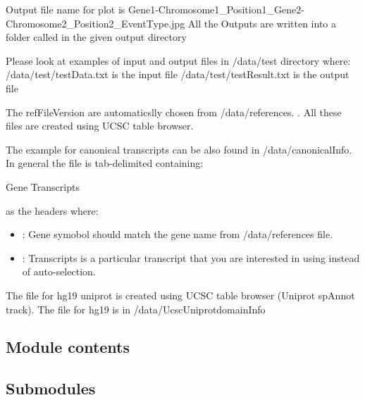 \documentclass[letterpaper,10pt,english]{sphinxmanual}
\begin{document}
Output file name for plot is Gene1-Chromosome1\_Position1\_Gene2-Chromosome2\_Position2\_EventType.jpg
All the Outputs are written into a folder called  in the given output directory

Please look at examples of input  and output files in /data/test directory where:
/data/test/testData.txt is the input file
/data/test/testResult.txt is the output file

The refFileVersion are automaticslly chosen from /data/references. . All these files are created using UCSC table browser.

The example for canonical transcripts can be also found in /data/canonicalInfo. In general the file is tab-delimited containing:

Gene  Transcripts

as the headers where:
\begin{itemize}
\item {} 
 : Gene symobol should match the gene name from  /data/references file.

\item {} 
 : Transcripts is a particular transcript that you are interested in using instead of auto-selection.

\end{itemize}

The file for hg19 uniprot is created using UCSC table browser (Uniprot spAnnot track). The file for hg19 is in /data/UcscUniprotdomainInfo


\subsection{Module  contents}
\label{\detokenize{iAnnotateSV:module-iannotatesv-contents}}

\subsection{Submodules}
\label{\detokenize{iAnnotateSV:submodules}}
\end{document}
